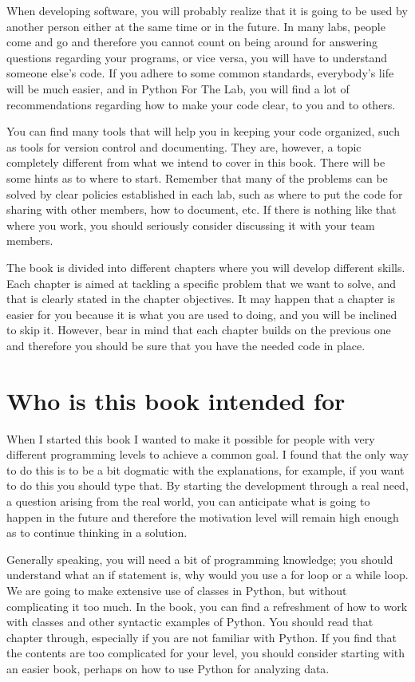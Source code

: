 When developing software, you will probably realize that it is going to be used by another person either at the same time or in the future. In many labs, people come and go and therefore you cannot count on being around for answering questions regarding your programs, or vice versa, you will have to understand someone else’s code. If you adhere to some common standards, everybody’s life will be much easier, and in Python For The Lab, you will find a lot of recommendations regarding how to make your code clear, to you and to others.

You can find many tools that will help you in keeping your code organized, such as tools for version control and documenting. They are, however, a topic completely different from what we intend to cover in this book. There will be some hints as to where to start. Remember that many of the problems can be solved by clear policies established in each lab, such as where to put the code for sharing with other members, how to document, etc. If there is nothing like that where you work, you should seriously consider discussing it with your team members.

The book is divided into different chapters where you will develop different skills. Each chapter is aimed at tackling a specific problem that we want to solve, and that is clearly stated in the chapter objectives. It may happen that a chapter is easier for you because it is what you are used to doing, and you will be inclined to skip it. However, bear in mind that each chapter builds on the previous one and therefore you should be sure that you have the needed code in place.

\section{Who is this book intended for}
When I started this book I wanted to make it possible for people with very different programming levels to achieve a common goal. I found that the only way to do this is to be a bit dogmatic with the explanations, for example, if you want to do this you should type that. By starting the development through a real need, a question arising from the real world, you can anticipate what is going to happen in the future and therefore the motivation level will remain high enough as to continue thinking in a solution.

Generally speaking, you will need a bit of programming knowledge; you should understand what an if statement is, why would you use a for loop or a while loop. We are going to make extensive use of classes in Python, but without complicating it too much. In the book, you can find a refreshment of how to work with classes and other syntactic examples of Python. You should read that chapter through, especially if you are not familiar with Python. If you find that the contents are too complicated for your level, you should consider starting with an easier book, perhaps on how to use Python for analyzing data.

